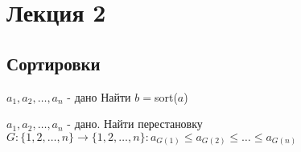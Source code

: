 \section{Лекция 2}

\subsection{Сортировки}

\begin{task}
$a_1, a_2, \ldots, a_n$ - дано
Найти $b = $sort($a$)
\end{task}
\begin{task}
    $a_1, a_2, \ldots, a_n$ - дано. Найти перестановку $G: \{1, 2, \ldots , n\} \rightarrow \{1, 2, \ldots, n\} \colon a_{G(1)} \leq a_{G(2)} \leq \ldots \leq a_{G(n)}$ 
\end{task}

